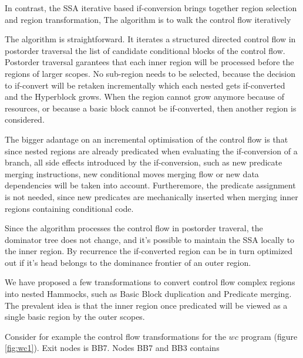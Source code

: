 In contrast, the SSA iterative based if-conversion  brings together region selection and region transformation, The algorithm is to walk the control flow iteratively 

The algorithm is straightforward. It iterates a structured directed control flow in postorder traversal the list of candidate conditional blocks of the control flow. Postorder traversal garantees that each inner region will be processed before the regions of larger scopes. No sub-region needs to be selected, because the decision to if-convert will be retaken incrementally which each nested gets if-converted and the Hyperblock grows. When the region cannot grow anymore because of resources, or because a basic block cannot be if-converted, then another region is considered.

The bigger adantage on an incremental optimisation of the control flow is that since nested regions are already predicated when evaluating the if-conversion of a branch, all side effects introduced by the if-conversion, such as new predicate merging instructions, new conditional moves merging flow or new data dependencies will be taken into account. Furtheremore, the predicate assignment is not needed, since new predicates are mechanically inserted when merging inner regions containing conditional code.

Since the algorithm processes the control flow in postorder traveral, the dominator tree does not change, and it's possible to maintain the SSA locally to the inner region. By recurrence the if-converted region can be in turn optimized out if it's head belongs to the dominance frontier of an outer region.

We have proposed a few transformations to convert control flow complex regions into nested Hammocks, such as Basic Block duplication and Predicate merging. The prevalent idea is that the inner region once predicated will be viewed as a single basic region by the outer scopes.

Consider for example the control flow transformations for the $wc$ program (figure \ref{fig:wc1}). Exit nodes is BB7. Nodes BB7 and BB3 contains 

